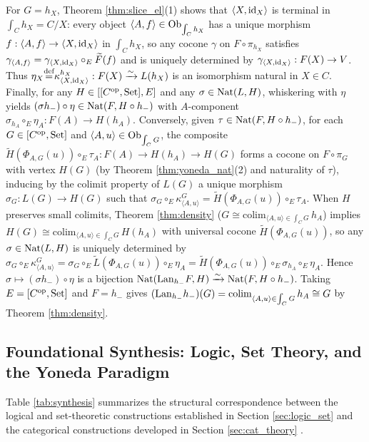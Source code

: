 \documentclass[10pt,a4paper]{article}
\begin{document}
\begin{enumerate}
For $G = h_X$, Theorem \ref{thm:slice_el}(1) shows that $\langle X, {\textrm{id}}_X \rangle$ is terminal in $\int_C h_X = C / X$: every object $\langle A, f \rangle \in {\textrm{Ob}}_{\int_C h_X}$ has a unique morphism $f : \langle A, f \rangle \to \langle X, {\textrm{id}}_X \rangle$ in $\int_C h_X$, so any cocone $\gamma$ on $F \circ \pi_{h_X}$ satisfies $\gamma_{\langle A, f \rangle} = \gamma_{\langle X, {\textrm{id}}_X \rangle} \circ_E {\widetilde{F}\textrm{}}(f)$ and is uniquely determined by $\gamma_{\langle X, {\textrm{id}}_X \rangle} : F(X) \to V$. Thus $\eta_X {\stackrel{{\textrm{def}}}{=}} \kappa^{h_X}_{\langle X, {\textrm{id}}_X \rangle} : F(X) \xrightarrow{\sim} L(h_X)$ is an isomorphism natural in $X \in C$.
Finally, for any $H \in [[C^{\textrm{op}}, {\textrm{Set}}], E]$ and any $\sigma \in {\textrm{Nat}}(L, H)$, whiskering with $\eta$ yields $(\sigma h_-) \circ \eta \in {\textrm{Nat}}(F, H \circ h_-)$ with $A$-component $\sigma_{h_A} \circ_E \eta_A : F(A) \to H(h_A)$. Conversely, given $\tau \in {\textrm{Nat}}(F, H \circ h_-)$, for each $G \in [C^{\textrm{op}}, {\textrm{Set}}]$ and $\langle A, u \rangle \in {\textrm{Ob}}_{\int_C G}$, the composite $\widetilde{H}(\Phi_{A,G}(u)) \circ_E \tau_A : F(A) \to H(h_A) \to H(G)$ forms a cocone on $F \circ \pi_G$ with vertex $H(G)$ (by Theorem \ref{thm:yoneda_nat}(2) and naturality of $\tau$), inducing by the colimit property of $L(G)$ a unique morphism $\sigma_G : L(G) \to H(G)$ such that $\sigma_G \circ_E \kappa^G_{\langle A, u \rangle} = \widetilde{H}(\Phi_{A,G}(u)) \circ_E \tau_A$. When $H$ preserves small colimits, Theorem \ref{thm:density} ($G \cong \mathrm{colim}_{\langle A, u \rangle \in \int_C G}\, h_A$) implies $H(G) \cong \mathrm{colim}_{\langle A, u \rangle \in \int_C G}\, H(h_A)$ with universal cocone $\widetilde{H}(\Phi_{A,G}(u))$, so any $\sigma \in {\textrm{Nat}}(L, H)$ is uniquely determined by $\sigma_G \circ_E \kappa^G_{\langle A, u \rangle} = \sigma_G \circ_E \widetilde{L}(\Phi_{A,G}(u)) \circ_E \eta_A = \widetilde{H}(\Phi_{A,G}(u)) \circ_E \sigma_{h_A} \circ_E \eta_A$. Hence $\sigma \mapsto (\sigma h_-) \circ \eta$ is a bijection ${\textrm{Nat}}({\mathrm{Lan}}_{h_-} F, H) \xrightarrow{\sim} {\textrm{Nat}}(F, H \circ h_-)$. Taking $E = [C^{\textrm{op}}, {\textrm{Set}}]$ and $F = h_-$ gives $({\mathrm{Lan}}_{h_-} h_-)(G) = \mathrm{colim}_{\langle A, u \rangle \in \int_C G}\, h_A \cong G$ by Theorem \ref{thm:density}.
\end{enumerate}
\myqed

\subsection{Foundational Synthesis: Logic, Set Theory, and the Yoneda Paradigm}\label{sec:synthesis}
Table \ref{tab:synthesis} summarizes the structural correspondence between the logical and set-theoretic constructions established in Section \ref{sec:logic_set} and the categorical constructions developed in Section \ref{sec:cat_theory} \cite{MacLane1998,Awodey2010,Riehl2016,Borceux1994}.
\end{document}
